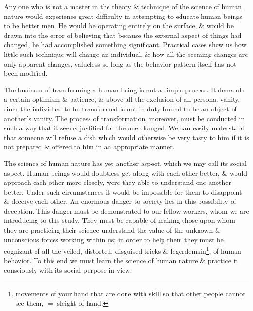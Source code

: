 \documentclass{article}
\begin{document}
Any one who is not a master in the theory \& technique of the science of human nature would experience great difficulty in attempting to educate human beings to be better men. He would be operating entirely on the surface, \& would be drawn into the error of believing that because the external aspect of things had changed, he had accomplished something significant. Practical cases show us how little such technique will change an individual, \& how all the seeming changes are only apparent changes, valueless so long as the behavior pattern itself has not been modified.

The business of transforming a human being is not a simple process. It demands a certain optimism \& patience, \& above all the exclusion of all personal vanity, since the individual to be transformed is not in duty bound to be an object of another's vanity. The process of transformation, moreover, must be conducted in such a way that it seems justified for the one changed. We can easily understand that someone will refuse a dish which would otherwise be very tasty to him if it is not prepared \& offered to him in an appropriate manner.

The science of human nature has yet another aspect, which we may call its social aspect. Human beings would doubtless get along with each other better, \& would approach each other more closely, were they able to understand one another better. Under such circumstances it would be impossible for them to disappoint \& deceive each other. An enormous danger to society lies in this possibility of deception. This danger must be demonstrated to our fellow-workers, whom we are introducing to this study. They must be capable of making those upon whom they are practicing their science understand the value of the unknown \& unconscious forces working within us; in order to help them they must be cognizant of all the veiled, distorted, disguised tricks \& legerdemain\footnote{movements of your hand that are done with skill so that other people cannot see them, $=$ sleight of hand.}, of human behavior. To this end we must learn the science of human nature \& practice it consciously with its social purpose in view.
\end{document}
